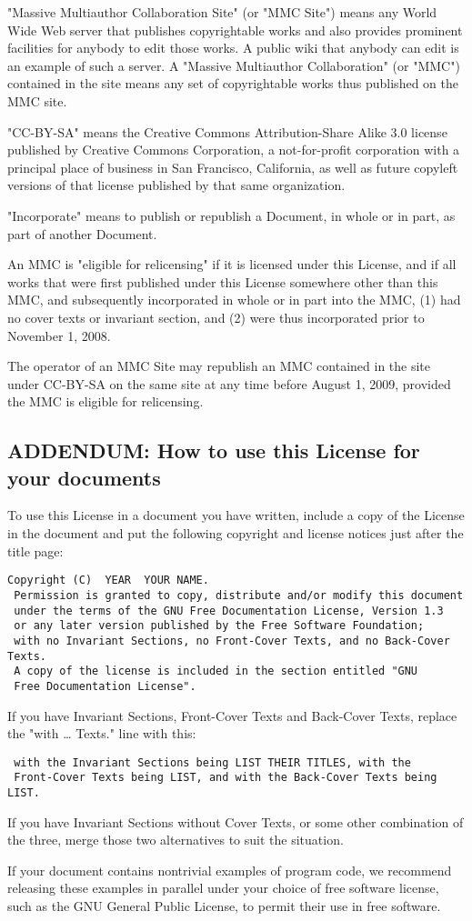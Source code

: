 "Massive Multiauthor Collaboration Site" (or "MMC Site") means any World Wide Web server that publishes copyrightable works and also provides prominent 
facilities for anybody to edit those works. A public wiki that anybody can edit is an example of such a server. A "Massive Multiauthor Collaboration" 
(or "MMC") contained in the site means any set of copyrightable works thus published on the MMC site.

"CC-BY-SA" means the Creative Commons Attribution-Share Alike 3.0 license published by Creative Commons Corporation, a not-for-profit corporation 
with a principal place of business in San Francisco, California, as well as future copyleft versions of that license published by that same organization.

"Incorporate" means to publish or republish a Document, in whole or in part, as part of another Document.

An MMC is "eligible for relicensing" if it is licensed under this License, and if all works that were first published under this License somewhere 
other than this MMC, and subsequently incorporated in whole or in part into the MMC, (1) had no cover texts or invariant section, and (2) were thus 
incorporated prior to November 1, 2008.

The operator of an MMC Site may republish an MMC contained in the site under CC-BY-SA on the same site at any time before August 1, 2009, provided 
the MMC is eligible for relicensing.


\subsection*{ADDENDUM: How to use this License for your documents}

To use this License in a document you have written, include a copy of the License in the document and put the following copyright and license notices just after the title page:
\small
\begin{verbatim}
Copyright (C)  YEAR  YOUR NAME.
 Permission is granted to copy, distribute and/or modify this document
 under the terms of the GNU Free Documentation License, Version 1.3
 or any later version published by the Free Software Foundation;
 with no Invariant Sections, no Front-Cover Texts, and no Back-Cover Texts.
 A copy of the license is included in the section entitled "GNU
 Free Documentation License".
\end{verbatim}
\normalsize

If you have Invariant Sections, Front-Cover Texts and Back-Cover Texts, replace the "with … Texts." line with this:
\small
\begin{verbatim}
 with the Invariant Sections being LIST THEIR TITLES, with the
 Front-Cover Texts being LIST, and with the Back-Cover Texts being LIST.
\end{verbatim}
\normalsize
If you have Invariant Sections without Cover Texts, or some other combination of the three, merge those two alternatives to suit the situation.

If your document contains nontrivial examples of program code, we recommend releasing these examples in parallel under your choice of free software 
license, such as the GNU General Public License, to permit their use in free software.

